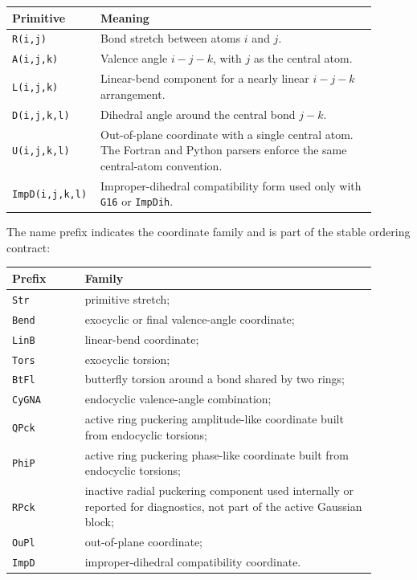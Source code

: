 \documentclass[11pt]{article}
\begin{document}
\begin{longtable}{@{}p{0.17\linewidth}p{0.73\linewidth}@{}}
\toprule
Primitive & Meaning \\
\midrule
\endhead
\texttt{R(i,j)} & Bond stretch between atoms \(i\) and \(j\). \\
\texttt{A(i,j,k)} & Valence angle \(i-j-k\), with \(j\) as the central atom. \\
\texttt{L(i,j,k)} & Linear-bend component for a nearly linear \(i-j-k\)
arrangement. \\
\texttt{D(i,j,k,l)} & Dihedral angle around the central bond \(j-k\). \\
\texttt{U(i,j,k,l)} & Out-of-plane coordinate with a single central atom.  The
Fortran and Python parsers enforce the same central-atom convention. \\
\texttt{ImpD(i,j,k,l)} & Improper-dihedral compatibility form used only with
\texttt{G16} or \texttt{ImpDih}. \\
\bottomrule
\end{longtable}

\noindent
The name prefix indicates the coordinate family and is part of the stable
ordering contract:

\begin{longtable}{@{}p{0.18\linewidth}p{0.72\linewidth}@{}}
\toprule
Prefix & Family \\
\midrule
\endhead
\texttt{Str} & primitive stretch; \\
\texttt{Bend} & exocyclic or final valence-angle coordinate; \\
\texttt{LinB} & linear-bend coordinate; \\
\texttt{Tors} & exocyclic torsion; \\
\texttt{BtFl} & butterfly torsion around a bond shared by two rings; \\
\texttt{CyGNA} & endocyclic valence-angle combination; \\
\texttt{QPck} & active ring puckering amplitude-like coordinate built from
endocyclic torsions; \\
\texttt{PhiP} & active ring puckering phase-like coordinate built from
endocyclic torsions; \\
\texttt{RPck} & inactive radial puckering component used internally or
reported for diagnostics, not part of the active Gaussian block; \\
\texttt{OuPl} & out-of-plane coordinate; \\
\texttt{ImpD} & improper-dihedral compatibility coordinate. \\
\bottomrule
\end{longtable}
\end{document}
